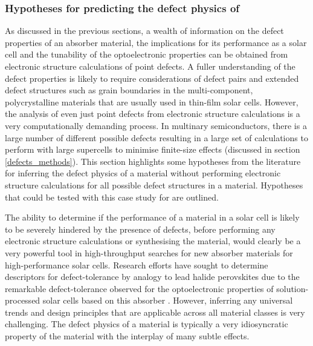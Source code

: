 \documentclass[11pt, twoside]{report}
\begin{document}
\subsubsection{Hypotheses for predicting the defect physics of {\enargite}}
As discussed in the previous sections, a wealth of information on the defect properties of an absorber material, the implications for its performance as a solar cell and the tunability of the optoelectronic properties can be obtained from electronic structure calculations of point defects. A fuller understanding of the defect properties is likely to require considerations of defect pairs and extended defect structures such as grain boundaries in the multi-component, polycrystalline materials that are usually used in thin-film solar cells.
However, the analysis of even just point defects from electronic structure calculations is a very computationally demanding process.
In multinary semiconductors, there is a large number of different possible defects resulting in a large set of calculations to perform with large supercells to minimise finite-size effects (discussed in section \ref{defects_methods}). This section highlights some hypotheses from the literature for inferring the defect physics of a material without performing electronic structure calculations for all possible defect structures in a material. Hypotheses that could be tested with this case study for {\enargite} are outlined. 

The ability to determine if the performance of a material in a solar cell is likely to be severely hindered by the presence of defects, before performing any electronic structure calculations or synthesising the material, would clearly be a very powerful tool in high-throughput searches for new absorber materials for high-performance solar cells. Research efforts have sought to determine descriptors for defect-tolerance by analogy to lead halide perovskites \cite{MIT_defect_tolerance} due to the remarkable defect-tolerance observed for the optoelectronic properties of solution-processed solar cells based on this absorber \cite{MAPI_defect_tolerance_Berry, MAPI_defect_phys}. However, inferring any universal trends and design principles that are applicable across all material classes is very challenging. The defect physics of a material is typically a very idiosyncratic property of the material with the interplay of many subtle effects.
\end{document}
